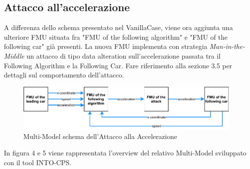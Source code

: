 \subsection{Attacco all'accelerazione}
A differenza dello schema presentato nel VanillaCase, viene ora aggiunta una ulteriore FMU situata fra "FMU of the following algorithm" e "FMU of the following car" già presenti. La nuova FMU implementa con strategia \textit{Man-in-the-Middle} un attacco di tipo data alteration sull'accelerazione passata tra il Following Algorithm e la Following Car. Fare riferimento alla sezione 3.5 per dettagli sul comportamento dell'attacco.
\begin{figure}[H]
	\centering
	\includegraphics{img/AccelAttackSchema.pdf}
	\caption{Multi-Model schema dell'Attacco alla Accelerazione}
\end{figure}

In figura 4 e 5 viene rappresentata l'overview del relativo Multi-Model sviluppato con il tool INTO-CPS. 

